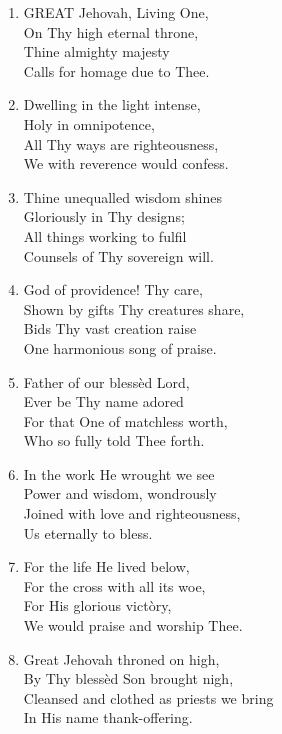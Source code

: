 \begin{enumerate}
    \item GREAT Jehovah, Living One, \\
        On Thy high eternal throne, \\
        Thine almighty majesty \\
        Calls for homage due to Thee.

    \item Dwelling in the light intense, \\
        Holy in omnipotence, \\
        All Thy ways are righteousness, \\
        We with reverence would confess.

    \item Thine unequalled wisdom shines \\
        Gloriously in Thy designs; \\
        All things working to fulfil \\
        Counsels of Thy sovereign will.

    \item God of providence! Thy care, \\
        Shown by gifts Thy creatures share, \\
        Bids Thy vast creation raise \\
        One harmonious song of praise.

    \item Father of our bless\`ed Lord, \\
        Ever be Thy name adored \\
        For that One of matchless worth, \\
        Who so fully told Thee forth.

    \item In the work He wrought we see \\
        Power and wisdom, wondrously \\
        Joined with love and righteousness, \\
        Us eternally to bless.

    \item For the life He lived below, \\
        For the cross with all its woe, \\
        For His glorious vict\`ory, \\
        We would praise and worship Thee.

    \item[\textbf{8.\textdagger{}}] Great Jehovah throned on high, \\
        By Thy bless\`ed Son brought nigh, \\
        Cleansed and clothed as priests we bring \\
        In His name thank-offering.

\end{enumerate}

